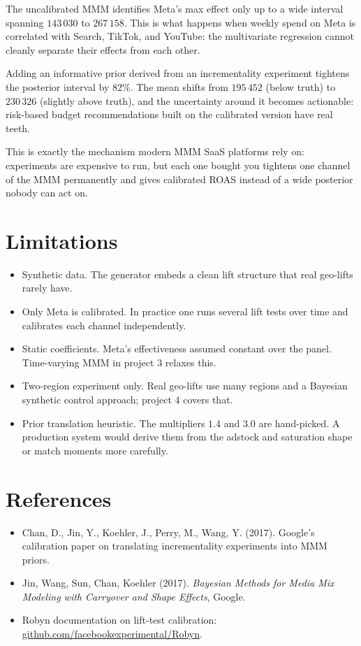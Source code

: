 \documentclass[a4paper,11pt]{article}
\begin{document}
The uncalibrated MMM identifies Meta's max effect only up to a wide
interval spanning $143\,030$ to $267\,158$. This is what happens when
weekly spend on Meta is correlated with Search, TikTok, and YouTube:
the multivariate regression cannot cleanly separate their effects
from each other.

Adding an informative prior derived from an incrementality experiment
tightens the posterior interval by 82\%. The mean shifts from
$195\,452$ (below truth) to $230\,326$ (slightly above truth), and the
uncertainty around it becomes actionable: risk-based budget
recommendations built on the calibrated version have real teeth.

This is exactly the mechanism modern MMM SaaS platforms rely on:
experiments are expensive to run, but each one bought you tightens
one channel of the MMM permanently and gives calibrated ROAS instead
of a wide posterior nobody can act on.

\section{Limitations}

\begin{itemize}
\item Synthetic data. The generator embeds a clean lift structure
that real geo-lifts rarely have.
\item Only Meta is calibrated. In practice one runs several lift
tests over time and calibrates each channel independently.
\item Static coefficients. Meta's effectiveness assumed constant over
the panel. Time-varying MMM in project 3 relaxes this.
\item Two-region experiment only. Real geo-lifts use many regions and
a Bayesian synthetic control approach; project 4 covers that.
\item Prior translation heuristic. The multipliers $1.4$ and $3.0$
are hand-picked. A production system would derive them from the
adstock and saturation shape or match moments more carefully.
\end{itemize}

\section{References}

\begin{itemize}
\item Chan, D., Jin, Y., Koehler, J., Perry, M., Wang, Y. (2017).
Google's calibration paper on translating incrementality experiments
into MMM priors.
\item Jin, Wang, Sun, Chan, Koehler (2017). \emph{Bayesian Methods for
Media Mix Modeling with Carryover and Shape Effects}, Google.
\item Robyn documentation on lift-test calibration:
\href{https://github.com/facebookexperimental/Robyn}{github.com/facebookexperimental/Robyn}.
\end{itemize}
\end{document}
